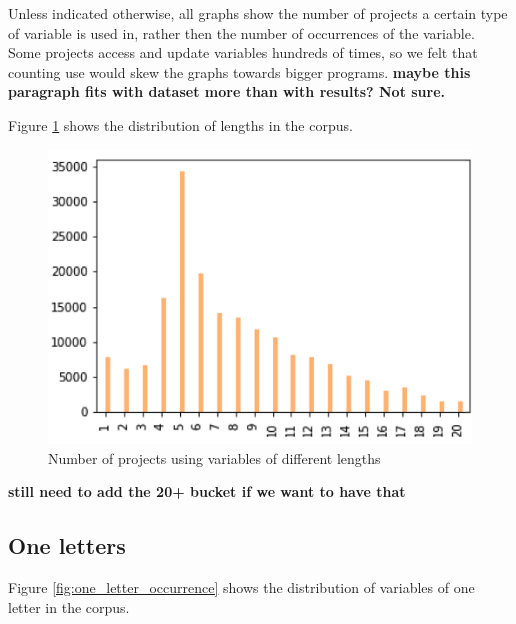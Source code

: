 \documentclass[conference]{IEEEtran}
\newcommand{\todo}[1]{ \textbf{#1} }
\begin{document}
Unless indicated otherwise, all graphs show the number of projects a certain type of variable is used in, rather then the number of occurrences of the variable. Some projects access and update variables hundreds of times, so we felt that counting use would skew the graphs towards bigger programs.
\todo{maybe this paragraph fits with dataset more than with results? Not sure.}

Figure \ref{fig:distribution_of_lengths} shows the distribution of lengths in the corpus.

\begin{figure}[h]
	\begin{center}
		\includegraphics[width=\columnwidth]{fig/distribution_of_lengths}
		\caption{Number of projects using variables of different lengths}
		\label{fig:distribution_of_lengths}
	\end{center}
\end{figure} 

\todo{still need to add the 20+ bucket if we want to have that}

\subsection{One letters}

Figure \ref{fig:one_letter_occurrence} shows the distribution of variables of one letter in the corpus.
\end{document}
